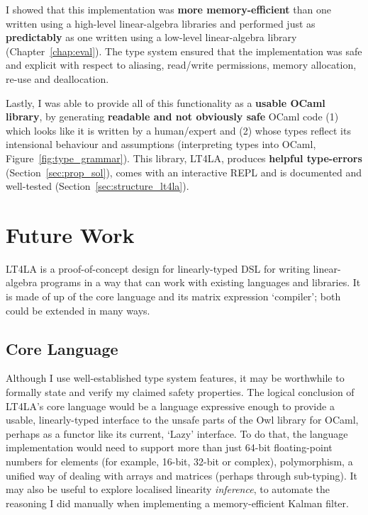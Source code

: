 I showed that this implementation was \textbf{more memory-efficient} than one
written using a high-level linear-algebra libraries and performed just as
\textbf{predictably} as one written using a low-level linear-algebra library
(Chapter~\ref{chap:eval}). The type system ensured that the implementation was
safe and explicit with respect to aliasing, read/write permissions, memory
allocation, re-use and deallocation.

Lastly, I was able to provide all of this functionality as a \textbf{usable
OCaml library}, by generating \textbf{readable and not obviously safe} OCaml
code (1) which looks like it is written by a human/expert and (2) whose types
reflect its intensional behaviour and assumptions (interpreting types into
OCaml, Figure~\ref{fig:type_grammar}). This library, LT4LA, produces
\textbf{helpful type-errors} (Section~\ref{sec:prop_sol}), comes with an
interactive REPL and is documented and well-tested
(Section~\ref{sec:structure_lt4la}).

\section{Future Work}

LT4LA is a proof-of-concept design for linearly-typed DSL for writing
linear-algebra programs in a way that can work with existing languages and
libraries. It is made of up of the core language and its matrix expression
`compiler'; both could be extended in many ways.

\subsection{Core Language}

Although I use well-established type system features, it may be worthwhile to
formally state and verify my claimed safety properties.  The logical conclusion
of LT4LA's core language would be a language expressive enough to provide a
usable, linearly-typed interface to the unsafe parts of the Owl library for
OCaml, perhaps as a functor like its current, `Lazy' interface.  To do that,
the language implementation would need to support more than just 64-bit
floating-point numbers for elements (for example, 16-bit, 32-bit or complex),
polymorphism, a unified way of dealing with arrays and matrices (perhaps
through sub-typing). It may also be useful to explore localised linearity
\emph{inference}, to automate the reasoning I did manually when implementing a
memory-efficient Kalman filter.


